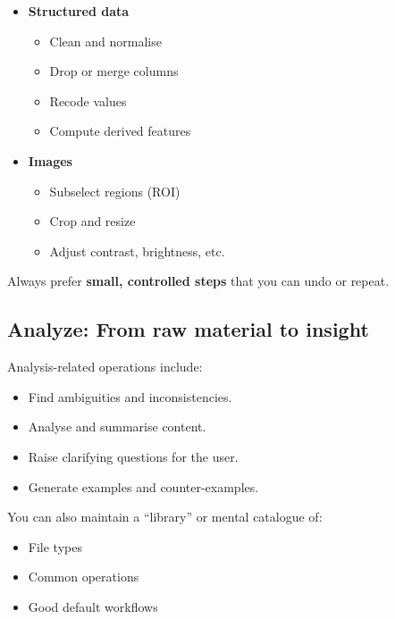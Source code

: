 \documentclass[
  letterpaper,
  DIV=11,
  numbers=noendperiod]{scrreprt}
\providecommand{\tightlist}{%
  \setlength{\itemsep}{0pt}\setlength{\parskip}{0pt}}
\begin{document}
\begin{itemize}
\tightlist
\item
  \textbf{Structured data}

  \begin{itemize}
  \tightlist
  \item
    Clean and normalise
  \item
    Drop or merge columns
  \item
    Recode values
  \item
    Compute derived features
  \end{itemize}
\item
  \textbf{Images}

  \begin{itemize}
  \tightlist
  \item
    Subselect regions (ROI)
  \item
    Crop and resize
  \item
    Adjust contrast, brightness, etc.
  \end{itemize}
\end{itemize}

Always prefer \textbf{small, controlled steps} that you can undo or
repeat.

\subsection{Analyze: From raw material to
insight}\label{analyze-from-raw-material-to-insight}

Analysis-related operations include:

\begin{itemize}
\tightlist
\item
  Find ambiguities and inconsistencies.
\item
  Analyse and summarise content.
\item
  Raise clarifying questions for the user.
\item
  Generate examples and counter-examples.
\end{itemize}

You can also maintain a ``library'' or mental catalogue of:

\begin{itemize}
\tightlist
\item
  File types
\item
  Common operations
\item
  Good default workflows
\end{itemize}
\end{document}
